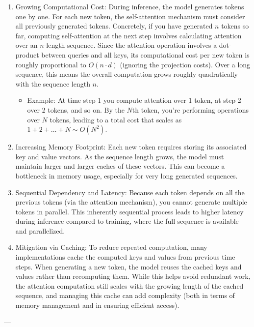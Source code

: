 \begin{enumerate}
	\item Growing Computational Cost: During inference, the model generates tokens one by one. For each new token, the self-attention mechanism must consider all previously generated tokens. Concretely, if you have generated \( n \) tokens so far, computing self-attention at the next step involves calculating attention over an \( n \)-length sequence. Since the attention operation involves a dot-product between queries and all keys, its computational cost per new token is roughly proportional to \( O(n \cdot d) \) (ignoring the projection costs). Over a long sequence, this means the overall computation grows roughly quadratically with the sequence length \( n \).  
		\begin{itemize}
			\item Example: At time step 1 you compute attention over 1 token, at step 2 over 2 tokens, and so on. By the \( N \)th token, you’re performing operations over \( N \) tokens, leading to a total cost that scales as \( 1 + 2 + \dots + N \sim O(N^2) \).
		\end{itemize}
	\item Increasing Memory Footprint:  Each new token requires storing its associated key and value vectors. As the sequence length grows, the model must maintain larger and larger caches of these vectors. This can become a bottleneck in memory usage, especially for very long generated sequences.

	\item Sequential Dependency and Latency:  Because each token depends on all the previous tokens (via the attention mechanism), you cannot generate multiple tokens in parallel. This inherently sequential process leads to higher latency during inference compared to training, where the full sequence is available and parallelized.
	\item Mitigation via Caching:  
   To reduce repeated computation, many implementations cache the computed keys and values from previous time steps. When generating a new token, the model reuses the cached keys and values rather than recomputing them. While this helps avoid redundant work, the attention computation still scales with the growing length of the cached sequence, and managing this cache can add complexity (both in terms of memory management and in ensuring efficient access).
\end{enumerate}



---

